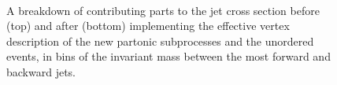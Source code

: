 \begin{figure}[H] 
\centering
{} \\
\caption{A breakdown of contributing parts to the jet cross section before (top) and after (bottom) implementing the effective vertex description of the new partonic subprocesses and the unordered events, in bins of the invariant mass between the most forward and backward jets.}
\label{fig:fklmigration}
\end{figure}


